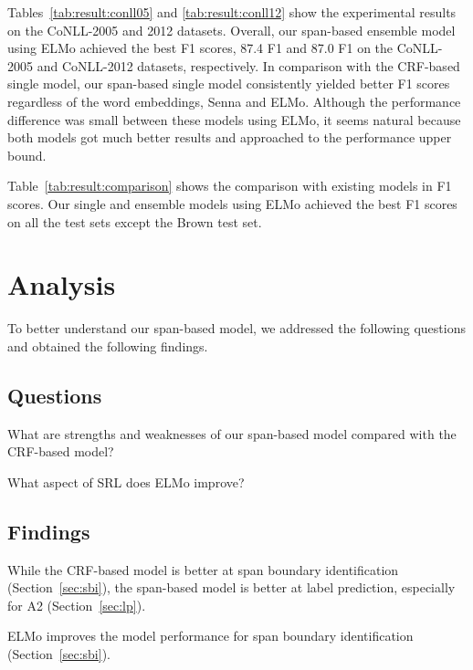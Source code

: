\documentclass[11pt,a4paper]{article}
\begin{document}
Tables~\ref{tab:result:conll05} and \ref{tab:result:conll12} show the experimental results on the CoNLL-2005 and 2012 datasets.
Overall, our span-based ensemble model using ELMo achieved the best F1 scores, 87.4 F1 and 87.0 F1 on the CoNLL-2005 and CoNLL-2012 datasets, respectively.
In comparison with the CRF-based single model, our span-based single model consistently yielded better F1 scores regardless of the word embeddings, {\sc Senna} and {\sc ELMo}.
Although the performance difference was small between these models using {\sc ELMo}, it seems natural because both models got much better results and approached to the performance upper bound.

Table~\ref{tab:result:comparison} shows the comparison with existing models in F1 scores.
Our single and ensemble models using {\sc ELMo} achieved the best F1 scores on all the test sets except the Brown test set.


\section{Analysis}
\label{sec:analysis}

To better understand our span-based model, we addressed the following questions and obtained the following findings.

\subsection*{Questions}
\begin{description}
\setlength{\parskip}{0cm} 
\setlength{\itemsep}{0cm} 
\item[(a)] What are strengths and weaknesses of our span-based model compared with the CRF-based model?
\item[(b)] What aspect of SRL does ELMo improve?
\end{description}

\subsection*{Findings}
\begin{description}
\setlength{\parskip}{0cm} 
\setlength{\itemsep}{0cm} 
\item[(a)] While the CRF-based model is better at span boundary identification (Section~\ref{sec:sbi}), the span-based model is better at label prediction, especially for A2 (Section~\ref{sec:lp}).
 \item[(b)] ELMo improves the model performance for span boundary identification (Section~\ref{sec:sbi}).
\end{description}
\end{document}

